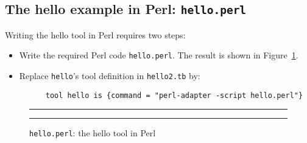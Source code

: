 \subsection{\label{Ex-hello.perl}The hello example in Perl: {\tt hello.perl}}

Writing the hello tool in Perl requires two steps:
\begin{itemize}
\item Write the required Perl code {\tt hello.perl}. The result is shown in Figure~\ref{fig:hello.perl}.
\item Replace {\tt hello}'s tool definition in {\tt hello2.tb} by:
\begin{verbatim}
      tool hello is {command = "perl-adapter -script hello.perl"}
\end{verbatim}
\end{itemize}


\begin{figure}
\rule{\textwidth}{0.5mm}

  \caption{{\tt hello.perl}: the hello tool in Perl}
  \label{fig:hello.perl}
\rule{\textwidth}{0.5mm}
\end{figure}
